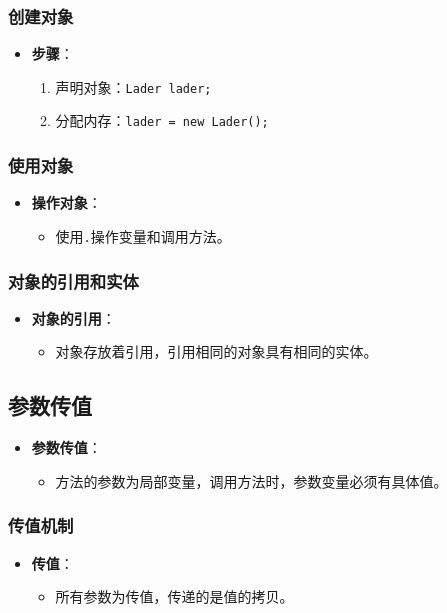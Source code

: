 \documentclass[a4paper, 10pt]{ctexart}
\begin{document}
\subsubsection{创建对象}
\begin{itemize}
  \item \textbf{步骤}：
  \begin{enumerate}
    \item 声明对象：\texttt{Lader lader;}
    \item 分配内存：\texttt{lader = new Lader();}
  \end{enumerate}
\end{itemize}

\subsubsection{使用对象}
\begin{itemize}
  \item \textbf{操作对象}：
  \begin{itemize}
    \item 使用\texttt{.}操作变量和调用方法。
  \end{itemize}
\end{itemize}

\subsubsection{对象的引用和实体}
\begin{itemize}
  \item \textbf{对象的引用}：
  \begin{itemize}
    \item 对象存放着引用，引用相同的对象具有相同的实体。
  \end{itemize}
\end{itemize}

\subsection{参数传值}
\begin{itemize}
  \item \textbf{参数传值}：
  \begin{itemize}
    \item 方法的参数为局部变量，调用方法时，参数变量必须有具体值。
  \end{itemize}
\end{itemize}

\subsubsection{传值机制}
\begin{itemize}
  \item \textbf{传值}：
  \begin{itemize}
    \item 所有参数为传值，传递的是值的拷贝。
  \end{itemize}
\end{itemize}
\end{document}
